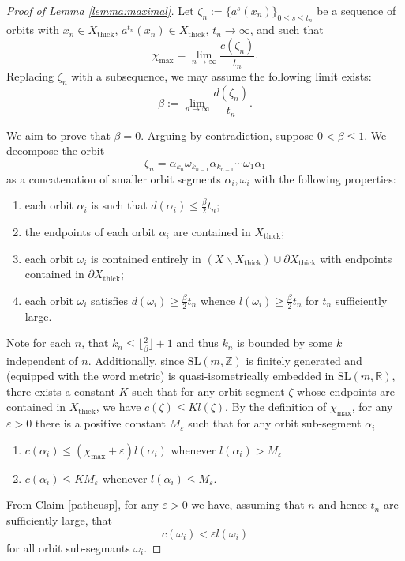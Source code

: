 \documentclass[10pt,reqno]{amsart}
\theoremstyle{Theorem}
\theoremstyle{definition}
\theoremstyle{remark}
\newcommand{\note}[1]{\marginpar{{\color{red}\footnotesize \begin{spacing}{1}#1\end{spacing}}}}
\renewcommand{\epsilon}{\varepsilon}
\newcommand{\sm}{\smallsetminus}
\newcommand{\R}{\mathbb {R}}
\newcommand{\Z}{\mathbb {Z}}
\newcommand{\e}{\epsilon}
\newcommand{\Xt}{X_{\mathrm{thick}}}
\newcommand{\Sl}{\mathrm{SL}}
\begin{document}
\begin{proof}[Proof of Lemma \ref{lemma:maximal}] Let $\zeta_n:= \{a^s (x_n)\}_{0\leq s \leq t_n}$ be a sequence of orbits with $x_n\in \Xt$, $a^{t_n}(x_n)\in \Xt$,  $t_n\to \infty$, and  such that  $$\chi_{\max} = \lim_{n \to \infty}\frac{ c(\zeta_n)}{ t_n}.$$
Replacing $\zeta_n$ with a subsequence, we may assume the following limit exists: $$\beta := \lim_{n \to \infty} \frac{d(\zeta_n)}{t_n}.$$

We aim to prove that $\beta = 0$. Arguing by contradiction,  suppose $0< \beta\le 1$. We decompose the orbit $$\zeta_n = %
\alpha_{k_n}\omega_{k_{n-1}}\alpha_{k_{n-1}}\cdots \omega_{1}\alpha_1$$ %
as a concatenation of smaller orbit segments $\alpha_i, \omega_i$ with the following properties:
\begin{enumerate}
\item each orbit $\alpha_i$ is  such that $d(\alpha_i) \leq \frac{\beta}{2} t_n$;
\item the endpoints of each orbit $\alpha_i$ are contained in $\Xt$;
\item  each orbit $\omega_i$ is  contained entirely in $(X\sm \Xt) \cup \partial \Xt$ with endpoints contained in $\partial \Xt$;
\item each orbit $\omega_i$  satisfies $d(\omega_i) \geq \frac{\beta}{2} t_n$  whence $l(\omega_i)\ge \frac {\beta}{2} t_n$ for $t_n$ sufficiently large.
\end{enumerate}
Note for each  $n$, that $k_n \leq \lfloor \frac{2}{\beta}\rfloor+ 1$ and  thus $k_n$ is   bounded by some $k$ independent of $n$. Additionally,  since   $\Sl(m, \Z)$  is finitely generated and (equipped with the word metric) is quasi-isometrically embedded  in  $\Sl(m, \R)$,  there exists a constant $K$ such that for any orbit  segment $\zeta$ whose endpoints are contained  in $\Xt$, we have  $c(\zeta) \leq K l(\zeta)$.
By the definition of $\chi_{\max}$, for any $\e> 0$ there is a positive constant $M_{\e}$ such that for any orbit sub-segment $\alpha_i$ %
\begin{enumerate}
\item $c(\alpha_i) \leq (\chi_{\max} + \e)l(\alpha_i)$    whenever  $l(\alpha_i) > M_\e$
\item $c(\alpha_i) \leq KM_\e$ whenever $l(\alpha_i) \leq M_{\e}$.
\end{enumerate}
From Claim  \ref{pathcusp}, for any   $\e>0$ we have, assuming that $n$ and hence $t_n$ are   sufficiently large,   that $$c(\omega_i) < \epsilon l(\omega_i)$$ for all orbit sub-segmants $\omega_i$.




\end{proof}
\end{document}
